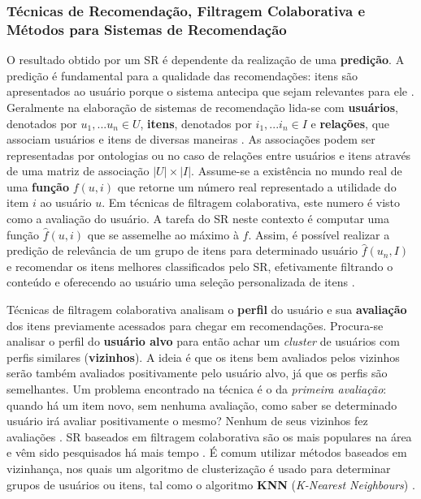 \documentclass[12pt]{article}
\begin{document}
\subsubsection{Técnicas de Recomendação, Filtragem Colaborativa e Métodos para Sistemas de Recomendação}

O resultado obtido por um SR é dependente da realização de uma \textbf{predição}. A predição é fundamental para a qualidade das recomendações: itens são apresentados ao usuário porque o sistema antecipa que sejam relevantes para ele \cite{ricci2011introduction}. Geralmente na elaboração de sistemas de recomendação lida-se com \textbf{usuários}, denotados por $ u_1, ... u_n \in U $, \textbf{itens}, denotados por $ i_1, ... i_n \in I$  e \textbf{relações}, que associam usuários e itens de diversas maneiras \cite{ekstrand2019recommender}. As associações podem ser representadas por ontologias \cite{primo2006tecnicas} ou no caso de relações entre usuários e itens através de uma matriz de associação $ |U| \times |I| $. 
Assume-se a existência no mundo real de uma \textbf{função} $ f (u, i) $ que retorne um número real representado a utilidade do item $i$ ao usuário $u$. Em técnicas de filtragem colaborativa, este numero é visto como a avaliação do usuário. A tarefa do SR neste contexto é computar uma função $\hat{f}(u, i)$ que se assemelhe ao máximo à $f$. Assim, é possível realizar a predição de relevância de um grupo de itens para determinado usuário $\hat{f}(u_n, I)$ e recomendar os itens melhores classificados pelo SR, efetivamente filtrando o conteúdo e oferecendo ao usuário uma seleção personalizada de itens \cite{ricci2011introduction}.


Técnicas de filtragem colaborativa analisam o \textbf{perfil} do usuário e sua \textbf{avaliação} dos itens previamente acessados para chegar em recomendações. Procura-se analisar o perfil do \textbf{usuário alvo} para então achar um \textit{cluster} de usuários com perfis similares (\textbf{vizinhos}). A ideia é que os itens bem avaliados pelos vizinhos serão também avaliados positivamente pelo usuário alvo, já que os perfis são semelhantes. Um problema encontrado na técnica é o da \textit{primeira avaliação}: quando há um item novo, sem nenhuma avaliação, como saber se determinado usuário irá avaliar positivamente o mesmo? Nenhum de seus vizinhos fez avaliações \cite{ricci2011introduction}. SR baseados em filtragem colaborativa são os mais populares na área e vêm sido pesquisados há mais tempo \cite{ricci2011introduction}. É comum utilizar métodos baseados em vizinhança, nos quais um algoritmo de clusterização é usado para determinar grupos de usuários ou itens, tal como o algoritmo \textbf{KNN} (\textit{K-Nearest Neighbours}) \cite{da2018desenvolvimento}.
\end{document}

